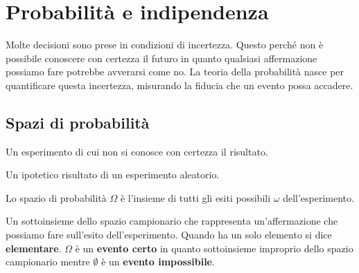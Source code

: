 \newpage
\section{Probabilità e indipendenza}
Molte decisioni sono prese in condizioni di incertezza. Questo perché non è possibile conoscere con certezza il futuro in quanto qualsiasi affermazione possiamo fare potrebbe avverarsi come no. La teoria della probabilità nasce per quantificare questa incertezza, misurando la fiducia che un evento possa accadere.
\subsection{Spazi di probabilità}

\begin{definition}
	Un esperimento di cui non si conosce con certezza il risultato.
\end{definition}

\begin{definition}[Esito]
	Un ipotetico risultato di un esperimento aleatorio.
\end{definition}

\begin{definition}
	Lo spazio di probabilità $\Omega$ è l'insieme di tutti gli esiti possibili $\omega$ dell'esperimento. 
\end{definition}

\begin{definition}[Evento]
	Un sottoinsieme dello spazio campionario che rappresenta un'affermazione che possiamo fare sull'esito dell'esperimento. Quando ha un solo elemento si dice \textbf{elementare}. $\Omega$ è un \textbf{evento certo} in quanto sottoinsieme improprio dello spazio campionario mentre $\emptyset$ è un \textbf{evento impossibile}.
\end{definition}


